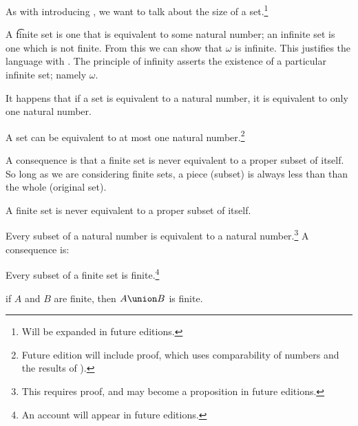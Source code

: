 

As with introducing , we want to talk about the size of a set.\footnote{Will be expanded in future editions.}


A \t{finite} set is one that is equivalent to some natural number; an infinite set is one which is not finite.
From this we can show that $\omega$ is infinite.
This justifies the language  with .
The principle of infinity asserts the existence of a particular infinite set; namely $\omega$.


It happens that if a set is equivalent to a natural number, it is equivalent to only one natural number.

\begin{proposition}
	A set can be equivalent to at most one natural number.\footnote{Future edition will include proof, which uses comparability of numbers and the results of ).}
\end{proposition}
A consequence is that a finite set is never equivalent to a proper subset of itself.
So long as we are considering finite sets, a piece (subset) is always less than than the whole (original set).
\begin{proposition}
	A finite set is never equivalent to a proper subset of itself.
\end{proposition}


Every subset of a natural number is equivalent to a natural number.\footnote{This requires proof, and may become a proposition in future editions.}
A consequence is:

\begin{proposition}
	Every subset of a finite set is finite.\footnote{An account will appear in future editions.}
\end{proposition}


\begin{proposition}
	if $A$ and $B$ are finite, then $A \union B$ is finite.
\end{proposition}


